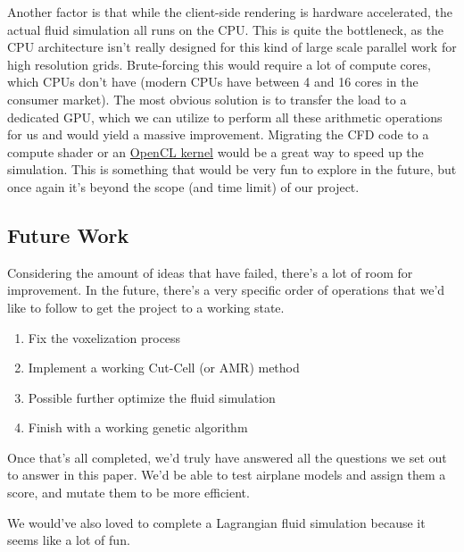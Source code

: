 \documentclass[a4paper,12pt,titlepage]{article}
\begin{document}
Another factor is that while the client-side rendering is hardware accelerated,
the actual fluid simulation all runs on the CPU. This is quite the bottleneck,
as the CPU architecture isn't really designed for this kind of large scale
parallel work for high resolution grids. Brute-forcing this would require a lot
of compute cores, which CPUs don't have (modern CPUs have between 4 and 16 cores
in the consumer market). The most obvious solution is to transfer the load to
a dedicated GPU, which we can utilize to perform all these arithmetic operations
for us and would yield a massive improvement. Migrating the CFD code to a compute
shader or an \href{https://en.wikipedia.org/wiki/OpenCL}{OpenCL kernel} would
be a great way to speed up the simulation. This is something that would be very
fun to explore in the future, but once again it's beyond the scope (and time limit)
of our project.

\subsection{Future Work}
Considering the amount of ideas that have failed, there's a lot of room for
improvement. In the future, there's a very specific order of operations that
we'd like to follow to get the project to a working state.
\begin{enumerate}
	\item{Fix the voxelization process}
	\item{Implement a working Cut-Cell (or AMR) method}
	\item{Possible further optimize the fluid simulation}
	\item{Finish with a working genetic algorithm}
\end{enumerate}
Once that's all completed, we'd truly have answered all the questions we set out
to answer in this paper. We'd be able to test airplane models and assign them a score,
and mutate them to be more efficient.

We would've also loved to complete a Lagrangian fluid simulation because it seems
like a lot of fun.

\pagebreak
\end{document}
